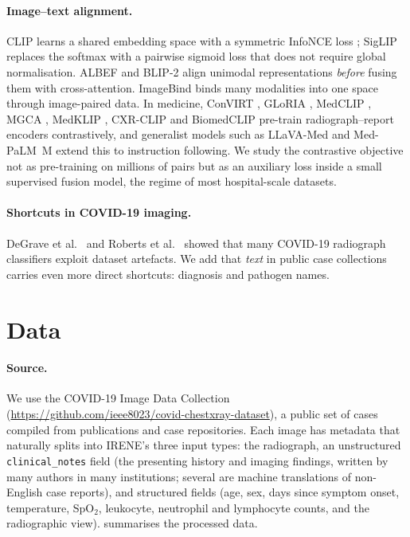 \paragraph{Image--text alignment.}
CLIP \citep{radford2021clip} learns a shared embedding space with a symmetric InfoNCE loss
\citep{oord2018cpc}; SigLIP \citep{zhai2023siglip} replaces the softmax with a pairwise sigmoid
loss that does not require global normalisation. ALBEF \citep{li2021albef} and BLIP-2
\citep{li2023blip2} align unimodal representations \emph{before} fusing them with cross-attention.
ImageBind \citep{girdhar2023imagebind} binds many modalities into one space through image-paired
data. In medicine, ConVIRT \citep{zhang2022convirt}, GLoRIA \citep{huang2021gloria},
MedCLIP \citep{wang2022medclip}, MGCA \citep{wang2022mgca}, MedKLIP \citep{wu2023medklip},
CXR-CLIP \citep{you2023cxrclip} and BiomedCLIP \citep{zhang2023biomedclip} pre-train
radiograph--report encoders contrastively, and generalist models such as LLaVA-Med
\citep{li2023llavamed} and Med-PaLM~M \citep{tu2024medpalmm} extend this to instruction following.
We study the contrastive objective not as pre-training on millions of pairs but as an auxiliary
loss inside a small supervised fusion model, the regime of most hospital-scale datasets.

\paragraph{Shortcuts in COVID-19 imaging.}
DeGrave et al.\ \citep{degrave2021shortcuts} and Roberts et al.\ \citep{roberts2021pitfalls}
showed that many COVID-19 radiograph classifiers exploit dataset artefacts. We add that
\emph{text} in public case collections carries even more direct shortcuts: diagnosis and
pathogen names.

\section{Data}
\label{sec:data}
\paragraph{Source.} We use the COVID-19 Image Data Collection \citep{cohen2020covid}
(\url{https://github.com/ieee8023/covid-chestxray-dataset}), a public set of cases compiled from
publications and case repositories. Each image has metadata that naturally splits into
IRENE's three input types: the radiograph, an unstructured \texttt{clinical\_notes} field
(the presenting history and imaging findings, written by many authors in many
institutions; several are machine translations of non-English case reports),
and structured fields (age, sex, days since symptom onset, temperature,
SpO$_2$, leukocyte, neutrophil and lymphocyte counts, and the radiographic view).
 summarises the processed data.

